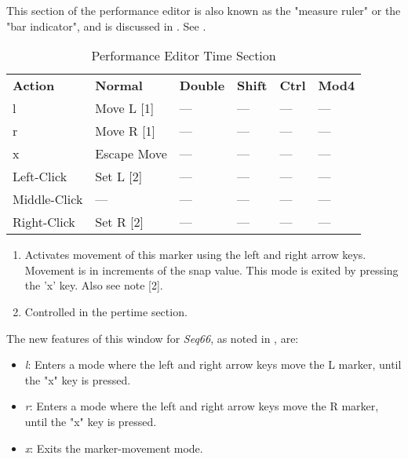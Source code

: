    This section of the performance editor is also known as the "measure ruler"
   or the "bar indicator", and is discussed in
   .
   See .

   \begin{table}[H]
      \centering
      \caption{Performance Editor Time Section}
      \label{table:performance_editor_time_section}
      \begin{tabular}{l l l l l l}
         \textbf{Action}   & \textbf{Normal} & \textbf{Double}    & \textbf{Shift} & \textbf{Ctrl}   & \textbf{Mod4}      \\
         l                 & Move L [1]      & ---                & ---            & ---             & ---                \\
         r                 & Move R [1]      & ---                & ---            & ---             & ---                \\
         x                 & Escape Move     & ---                & ---            & ---             & ---                \\
         Left-Click        & Set L [2]       & ---                & ---            & ---             & ---                \\
         Middle-Click      & ---             & ---                & ---            & ---             & ---                \\
         Right-Click       & Set R [2]       & ---                & ---            & ---             & ---                \\
      \end{tabular}
   \end{table}

   \begin{enumerate}
      \item Activates movement of this marker using the left and right arrow
         keys.  Movement is in increments of the snap value.  This mode is
         exited by pressing the 'x' key.  Also see note [2].
      \item Controlled in the pertime section.
   \end{enumerate}

   The new features of this window for \textsl{Seq66},
   as noted in
   ,
   are:

   \begin{itemize}
      \item \textsl{l}:  Enters a mode where the left and right arrow keys move
         the L marker, until the "x" key is pressed.
      \item \textsl{r}:  Enters a mode where the left and right arrow keys move
         the R marker, until the "x" key is pressed.
      \item \textsl{x}:  Exits the marker-movement  mode.
   \end{itemize}

